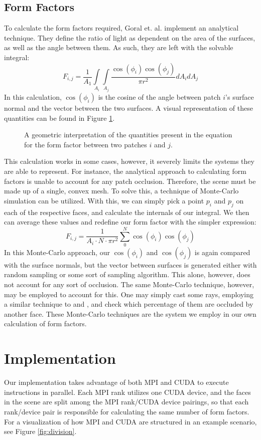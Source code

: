 \documentclass[conference]{IEEEtran}
\begin{document}
\subsection{Form Factors}
To calculate the form factors required, Goral et. al. \cite{b1} implement an analytical technique. They define the ratio of light as dependent on the area of the surfaces, as well as the angle between them. As such, they are left with the solvable integral:
\[
F_{i,j} = \frac{1}{A_1} \int \limits_{A_i}^{}\int \limits_{A_j}^{}\frac{\cos(\phi_i)\cos(\phi_j)}{\pi r^2} dA_i dA_j
\]
In this calculation, $\cos(\phi_i)$ is the cosine of the angle between patch $i$'s surface normal and the vector between the two surfaces. A visual representation of these quantities can be found in Figure \ref{fig:ff_geometry}.

\begin{figure}

\caption{A geometric interpretation of the quantities present in the equation for the form factor between two patches $i$ and $j$.}
\label{fig:ff_geometry}
\end{figure}

This calculation works in some cases, however, it severely limits the systems they are able to represent. For instance, the analytical approach to calculating form factors is unable to account for any patch occlusion. Therefore, the scene must be made up of a single, convex mesh. To solve this, a technique of Monte-Carlo simulation can be utilized. With this, we can simply pick a point $p_i$ and $p_j$ on each of the respective faces, and calculate the internals of our integral. We then can average these values and redefine our form factor with the simpler expression:
\[
F_{i,j} = \frac{1}{A_i\cdot N\cdot \pi r^2}\sum\limits_{0}^{N} \cos(\phi_i)\cos(\phi_j)
\]
In this Monte-Carlo approach, our $\cos(\phi_i)$ and $\cos(\phi_j)$ is again compared with the surface normals, but the vector between surfaces is generated either with random sampling or some sort of sampling algorithm.
This alone, however, does not account for any sort of occlusion. The same Monte-Carlo technique, however, may be employed to account for this. One may simply cast some rays, employing a similar technique to \cite{b10} and \cite{b9}, and check which percentage of them are occluded by another face. These Monte-Carlo techniques are the system we employ in our own calculation of form factors.
\section{Implementation}
Our implementation takes advantage of both MPI and CUDA to execute instructions in parallel. Each MPI rank utilizes one CUDA device, and the faces in the scene are split among the MPI rank/CUDA device pairings, so that each rank/device pair is responsible for calculating the same number of form factors. For a visualization of how MPI and CUDA are structured in an example scenario, see Figure \ref{fig:division}.
\end{document}
